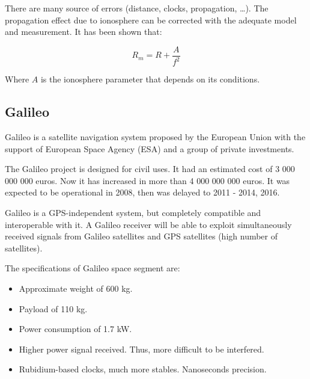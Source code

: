 \documentclass[
	12pt,
	twoside
]{book}
\begin{document}
There are many source of errors (distance, clocks, propagation, \ldots). The propagation effect due to ionosphere can be corrected with the adequate model and measurement. It has been shown that:

$$
	R_m = R + \frac {A} {f^2}
$$

Where $A$ is the ionosphere parameter that depends on its conditions.

\subsection{Galileo}

Galileo is a satellite navigation system proposed by the European Union with the support of European Space Agency (ESA) and a group of private investments.

The Galileo project is designed for civil uses. It had an estimated cost of 3 000 000 000 euros. Now it has increased in more than 4 000 000 000 euros. It was expected to be operational in 2008, then was delayed to 2011 - 2014, 2016.

Galileo is a GPS-independent system, but completely compatible and interoperable with it. A Galileo receiver will be able to exploit simultaneously received signals from Galileo satellites and GPS satellites (high number of satellites).

The specifications of Galileo space segment are:
\begin{itemize}
	\item Approximate weight of 600 kg.
	\item Payload of 110 kg.
	\item Power consumption of 1.7 kW.
	\item Higher power signal received. Thus, more difficult to be interfered.
	\item Rubidium-based clocks, much more stables. Nanoseconds precision.
\end{itemize}
\end{document}
